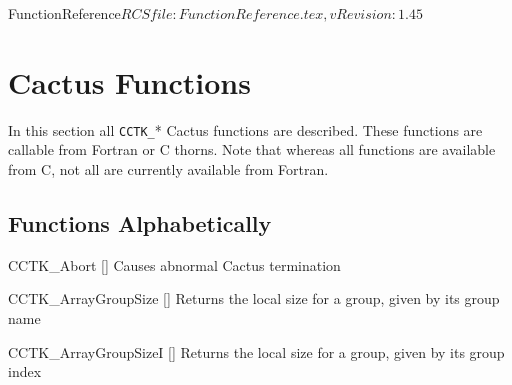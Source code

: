 \begin{cactuspart}{5}{FunctionReference}{$RCSfile: FunctionReference.tex,v $}{$Revision: 1.45 $}
\renewcommand{\thepage}{\Alph{part}\arabic{page}}


\chapter{Cactus Functions}

In this section all \hbox{{\tt CCTK\_}*} Cactus functions are described.
These functions are callable from Fortran or C thorns.  Note that whereas
all functions are available from C, not all are currently available
from Fortran.


\section{Functions Alphabetically}

\begin{Lentry}

\item[CCTK\_Abort]
  [\pageref{CCTK-Abort}]
  Causes abnormal Cactus termination

\item[CCTK\_ArrayGroupSize]
  [\pageref{CCTK-ArrayGroupSize}]
  Returns the local size for a group, given by its group name

\item[CCTK\_ArrayGroupSizeI]
  [\pageref{CCTK-ArrayGroupSizeI}]
  Returns the local size for a group, given by its group index


\end{Lentry}
\end{cactuspart}
